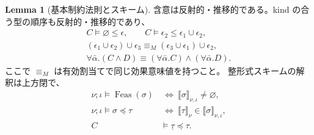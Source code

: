 \documentclass[a4paper,11pt]{article}
\theoremstyle{definition}
\newtheorem{lemma}[definition]{Lemma}
\newcommand{\emp}{\varnothing}
\newcommand{\den}[1]{\llbracket #1\rrbracket}
\newcommand{\inst}[2]{#1\preccurlyeq #2}
\newcommand{\mono}[1]{\underline{#1}}
\newcommand{\Feas}{\operatorname{Feas}}
\newcommand{\proofspace}{\Needspace{16\baselineskip}}
\begin{document}
\proofspace
\begin{samepage}
\begin{lemma}[基本制約法則とスキーム]\label{lem:basic}
含意は反射的・推移的である。kind の合う型の順序も反射的・推移的であり、
\begin{gather*}
 C\models\emp\leq\epsilon,\qquad
 C\models\epsilon_2\leq\epsilon_1\cup\epsilon_2,\\
 (\epsilon_1\cup\epsilon_2)\cup\epsilon_3
 \equiv_M (\epsilon_3\cup\epsilon_1)\cup\epsilon_2,\\
 \forall\bar\alpha.(C\land D)
 \equiv(\forall\bar\alpha.C)\land(\forall\bar\alpha.D).
\end{gather*}
ここで $\equiv_M$ は有効割当てで同じ効果意味値を持つこと。
整形式スキームの解釈は上方閉で、
\begin{align}
 \nu;\iota\models\Feas(\sigma)
 &\ \Longleftrightarrow\ \den\sigma_{\nu,\iota}\ne\emp,\label{eq:nonempty}\\
 \nu;\iota\models\inst\sigma\tau
 &\ \Longleftrightarrow\ \den\tau_\nu\in\den\sigma_{\nu,\iota},\label{eq:instance}\\
 C&\models\inst{\mono\tau}\tau.\label{eq:mono}
\end{align}
\end{lemma}
\end{samepage}
\nopagebreak[4]
\end{document}
